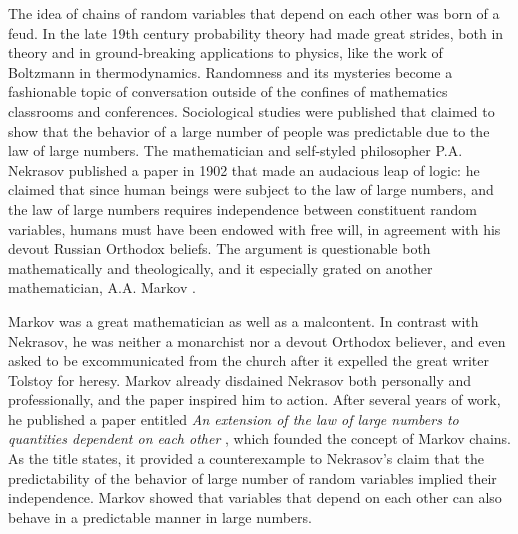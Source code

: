 \documentclass[
  letterpaper,
  DIV=11,
  numbers=noendperiod]{scrreprt}
\begin{document}
The idea of chains of random variables that depend on each other was
born of a feud. In the late 19th century probability theory had made
great strides, both in theory and in ground-breaking applications to
physics, like the work of Boltzmann in thermodynamics. Randomness and
its mysteries become a fashionable topic of conversation outside of the
confines of mathematics classrooms and conferences. Sociological studies
were published that claimed to show that the behavior of a large number
of people was predictable due to the law of large numbers. The
mathematician and self-styled philosopher P.A. Nekrasov published a
paper in 1902 that made an audacious leap of logic: he claimed that
since human beings were subject to the law of large numbers, and the law
of large numbers requires independence between constituent random
variables, humans must have been endowed with free will, in agreement
with his devout Russian Orthodox beliefs. The argument is questionable
both mathematically and theologically, and it especially grated on
another mathematician, A.A. Markov \cite{hayes_first_2012}.

Markov was a great mathematician as well as a malcontent. In contrast
with Nekrasov, he was neither a monarchist nor a devout Orthodox
believer, and even asked to be excommunicated from the church after it
expelled the great writer Tolstoy for heresy. Markov already disdained
Nekrasov both personally and professionally, and the paper inspired him
to action. After several years of work, he published a paper entitled
\emph{An extension of the law of large numbers to quantities dependent
on each other} \cite{markov_extension_1906}, which founded the concept
of Markov chains. As the title states, it provided a counterexample to
Nekrasov's claim that the predictability of the behavior of large number
of random variables implied their independence. Markov showed that
variables that depend on each other can also behave in a predictable
manner in large numbers.
\end{document}
